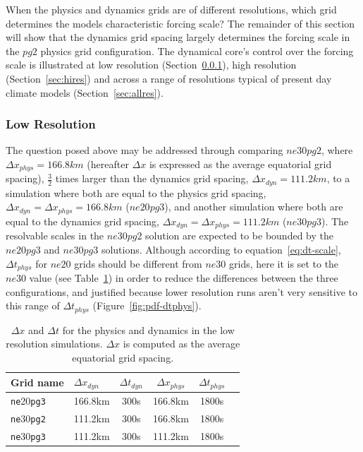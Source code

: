 \documentclass[draft,linenumbers]{agujournal}
\begin{document}
When the physics and dynamics grids are of different resolutions, which grid determines the models characteristic forcing scale? The remainder of this section will show that the dynamics grid spacing largely determines the forcing scale in the $pg2$ physics grid configuration. The dynamical core's control over the forcing scale is illustrated at low resolution (Section~\ref{sec:lores}), high resolution (Section~\ref{sec:hires}) and across a range of resolutions typical of present day climate models (Section~\ref{sec:allres}).

\subsubsection{Low Resolution}\label{sec:lores}

The question posed above may be addressed through comparing $ne30pg2$, where $\Delta x_{phys} = 166.8km$ (hereafter $\Delta x$ is expressed as the average equatorial grid spacing), $\frac{3}{2}$ times larger than the dynamics grid spacing, $\Delta x_{dyn} = 111.2km$, to a simulation where both are equal to the physics grid spacing, $\Delta x_{dyn} = \Delta x_{phys} = 166.8 km$ ($ne20pg3$), and another simulation where both are equal to the dynamics grid spacing, $\Delta x_{dyn} = \Delta x_{phys} = 111.2 km$ ($ne30pg3$). The resolvable scales in the $ne30pg2$ solution are expected to be bounded by the $ne20pg3$ and $ne30pg3$ solutions. Although according to equation~\eqref{eq:dt-scale}, $\Delta t_{phys}$ for $ne20$ grids should be different from $ne30$ grids, here it is set to the $ne30$ value (see Table~\ref{table:grids-lo}) in order to reduce the differences between the three configurations, and justified because lower resolution runs aren't very sensitive to this range of $\Delta t_{phys}$ (Figure~\ref{fig:pdf-dtphys}).

 \begin{table}
 \caption{$\Delta x$ and $\Delta t$ for the physics and dynamics in the low resolution simulations. $\Delta x$ is computed as the average equatorial grid spacing.}
 \centering
 \begin{tabular}{llcccc}
 \hline
 Grid name & $\Delta x_{dyn}$  & $\Delta t_{dyn}$ & $\Delta x_{phys}$  & $\Delta t_{phys}$ \\
 \hline
   {\tt{ne}}20{\tt{pg3}}  & 166.8km & 300s  & 166.8km & 1800s \\
   {\tt{ne}}30{\tt{pg2}}  & 111.2km & 300s  & 166.8km & 1800s \\
   {\tt{ne}}30{\tt{pg3}}  & 111.2km & 300s  & 111.2km & 1800s \\
 \hline
 \end{tabular}
 \label{table:grids-lo}
 \end{table}
\end{document}
